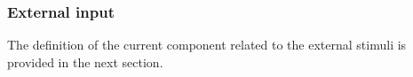 \subsubsection{External input}

The definition of the current component related to the external stimuli is provided in the next section.